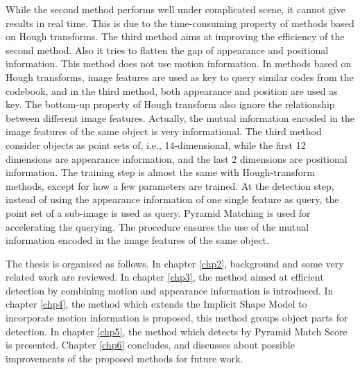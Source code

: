 While the second method performs well under complicated scene, it cannot give results in real time. This is due to the time-consuming property of methods based on Hough transforms.   The third method aims at improving the efficiency of the second method. Also it tries to flatten the gap of appearance and positional information. This method does not use motion information. In methods based on Hough transforms, image features are used as key to query similar codes from the codebook, and in the third method, both appearance and position are used as key. The bottom-up property of Hough transform also ignore the relationship between different image features. Actually, the mutual information encoded in the image features of the same object is very informational. The third method consider objects as point sets of, i.e., 14-dimensional, while the first 12 dimensions are appearance information, and the last 2 dimensions are positional information. The training step is almost the same with Hough-transform methods, except for how a few parameters are trained. At the detection step, instead of using the appearance information of one single feature as query, the point set of a sub-image is used as query. Pyramid Matching is used for accelerating the querying. The procedure ensures the use of the mutual information encoded in the image features of the same object.

The thesis is organised as follows. In chapter \ref{chp2}, background and some very related work are reviewed. In chapter \ref{chp3}, the method aimed at efficient detection by combining motion and appearance information is introduced. In chapter \ref{chp4}, the method which extends the Implicit Shape Model to incorporate motion information is proposed, this method groups object parts for detection. In chapter \ref{chp5}, the method which detects by Pyramid Match Score is presented. Chapter \ref{chp6} concludes, and discusses about possible improvements of the proposed methods for future work.



